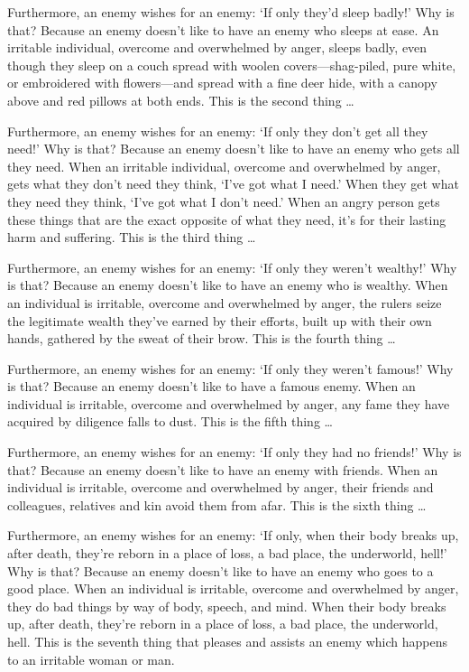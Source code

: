 \documentclass[12pt,openany]{book}%
\begin{document}
Furthermore, an enemy wishes for an enemy: ‘If only they’d sleep badly!’ Why is that? Because an enemy doesn’t like to have an enemy who sleeps at ease. An irritable individual, overcome and overwhelmed by anger, sleeps badly, even though they sleep on a couch spread with woolen covers—shag-piled, pure white, or embroidered with flowers—and spread with a fine deer hide, with a canopy above and red pillows at both ends. This is the second thing … 

Furthermore, an enemy wishes for an enemy: ‘If only they don’t get all they need!’ Why is that? Because an enemy doesn’t like to have an enemy who gets all they need. When an irritable individual, overcome and overwhelmed by anger, gets what they don’t need they think, ‘I’ve got what I need.’ When they get what they need they think, ‘I’ve got what I don’t need.’ When an angry person gets these things that are the exact opposite of what they need, it’s for their lasting harm and suffering. This is the third thing … 

Furthermore, an enemy wishes for an enemy: ‘If only they weren’t wealthy!’ Why is that? Because an enemy doesn’t like to have an enemy who is wealthy. When an individual is irritable, overcome and overwhelmed by anger, the rulers seize the legitimate wealth they’ve earned by their efforts, built up with their own hands, gathered by the sweat of their brow. This is the fourth thing … 

Furthermore, an enemy wishes for an enemy: ‘If only they weren’t famous!’ Why is that? Because an enemy doesn’t like to have a famous enemy. When an individual is irritable, overcome and overwhelmed by anger, any fame they have acquired by diligence falls to dust. This is the fifth thing … 

Furthermore, an enemy wishes for an enemy: ‘If only they had no friends!’ Why is that? Because an enemy doesn’t like to have an enemy with friends. When an individual is irritable, overcome and overwhelmed by anger, their friends and colleagues, relatives and kin avoid them from afar. This is the sixth thing … 

Furthermore, an enemy wishes for an enemy: ‘If only, when their body breaks up, after death, they’re reborn in a place of loss, a bad place, the underworld, hell!’ Why is that? Because an enemy doesn’t like to have an enemy who goes to a good place. When an individual is irritable, overcome and overwhelmed by anger, they do bad things by way of body, speech, and mind. When their body breaks up, after death, they’re reborn in a place of loss, a bad place, the underworld, hell. This is the seventh thing that pleases and assists an enemy which happens to an irritable woman or man. 
\end{document}
